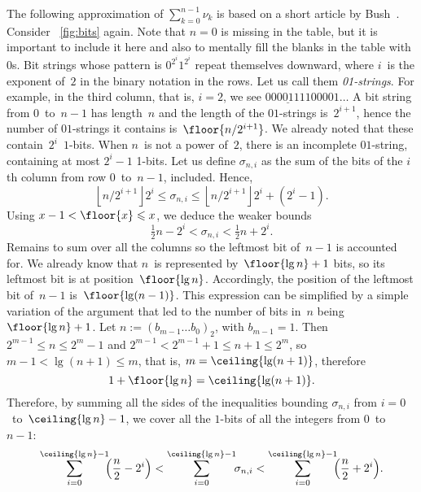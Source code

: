 The following approximation of \(\sum_{k=0}^{n-1}{\nu_k}\) is based on
a short article by Bush~\cite{Bush:1940}. Consider \fig~\ref{fig:bits}
again. Note that \(n=0\) is missing in the table, but it is important
to include it here and also to mentally fill the blanks in the table
with~\(0\)s. Bit strings whose pattern is \(0^{2^{i}}1^{2^{i}}\)
repeat themselves downward, where \(i\)~is the exponent of~\(2\) in
the binary notation in the rows. Let us call them
\emph{01-strings}. For example, in the third column, that is, \(i=2\),
we see \(\underline{00001111}00001\dots\) A bit string from
\(0\)~to~\(n-1\) has length~\(n\) and the length of the \(01\)-strings
is~\(2^{i+1}\), hence the number of \(01\)-strings it contains
is~\(\floor{n/2^{i+1}}\). We already noted that these
contain~\(2^i\)~\(1\)-bits. When \(n\)~is not a power of~\(2\), there
is an incomplete \(01\)-string, containing at most \(2^{i}-1\)
1-bits. Let us define \(\sigma_{n,i}\) as the sum of the bits of the
\(i\)th column from row \(0\)~to~\(n-1\), included. Hence,
\begin{equation*}
\left\lfloor{n/2^{i+1}}\right\rfloor 2^i \leqslant \sigma_{n,i}
\leqslant \left\lfloor{n/2^{i+1}}\right\rfloor 2^i + (2^i - 1).
\end{equation*}
Using \(x - 1 < \floor{x} \leqslant x\), we deduce the weaker bounds
\begin{equation*}
\tfrac{1}{2}n - 2^{i} < \sigma_{n,i} < \tfrac{1}{2}n + 2^{i}.
\end{equation*}
Remains to sum over all the columns so the leftmost bit of~\(n-1\) is
accounted for. We already know that \(n\)~is represented
by~\(\floor{\lg n}+1\) bits, so its leftmost bit is at
position~\(\floor{\lg n}\). Accordingly, the position of the leftmost
bit of~\(n-1\) is~\(\floor{\lg(n-1)}\). This expression can be
simplified by a simple variation of the argument that led to the
number of bits in~\(n\) being \(\floor{\lg n} + 1\). Let \(n :=
(b_{m-1}\dots b_0)_2\), with \(b_{m-1} = 1\). Then \(2^{m-1} \leqslant
n \leqslant 2^m - 1\) and \(2^{m-1} < 2^{m-1} + 1 \leqslant n + 1
\leqslant 2^m\), so \(m-1 < \lg(n+1) \leqslant m\), that is, \(m =
\ceiling{\lg(n+1)}\), therefore
\begin{equation}
1 + \floor{\lg n} = \ceiling{\lg(n+1)}.\label{eq:floor_ceiling}
\end{equation}
Therefore, by summing all the sides of the inequalities bounding
\(\sigma_{n,i}\) from \(i=0\)~to~\(\ceiling{\lg n}-1\), we cover all
the \(1\)-bits of all the integers from \(0\)~to~\(n-1\):
\begin{equation*}
\sum_{i=0}^{\ceiling{\lg n}-1}{\!\!\!\left(\frac{n}{2} - 2^{i}\right)}
< \sum_{i=0}^{\ceiling{\lg n}-1}{\!\!\sigma_{n,i}} <
\sum_{i=0}^{\ceiling{\lg n}-1}{\!\!\!\left(\frac{n}{2} + 2^{i}\right)}.
\end{equation*}
